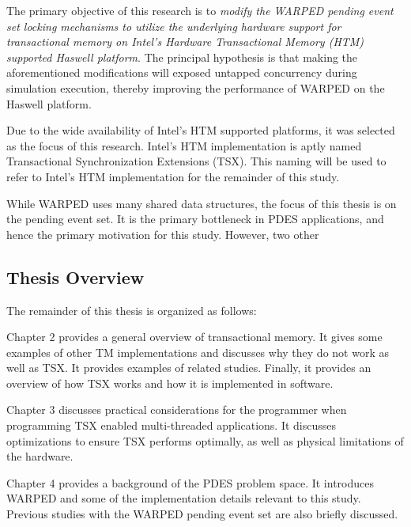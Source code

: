 \documentclass[a4paper]{article}
\begin{document}
\indent
The primary objective of this research is to \textit{modify the WARPED pending event set
    locking mechanisms to utilize the underlying hardware support for
    transactional memory on Intel's Hardware Transactional Memory (HTM)
supported Haswell platform}.  The principal hypothesis is that making the
aforementioned modifications will exposed untapped concurrency 
during simulation execution, thereby improving the performance of WARPED on the
Haswell platform.
\par

\indent
Due to the wide availability of Intel's HTM supported platforms, it was
selected as the focus of this research.  Intel's HTM implementation is aptly
named Transactional Synchronization Extensions (TSX).  This naming will be used
to refer to Intel's HTM implementation for the remainder of this study.
\par

\indent 
While WARPED uses many shared data structures, the focus of this thesis
is on the pending event set.  It is the primary bottleneck in PDES applications,
and hence the primary motivation for this study.  However, two other 
\par

\subsection{\textbf{Thesis Overview}}

The remainder of this thesis is organized as follows:
\par

\indent 
Chapter 2 provides a general overview of transactional memory.  It gives
some examples of other TM implementations and discusses why they do not work as
well as TSX.  It provides examples of related studies.  Finally, it provides an
overview of how TSX works and how it is implemented in software.
\par

\indent
Chapter 3 discusses practical considerations for the programmer when programming
TSX enabled multi-threaded applications.  It discusses optimizations to ensure
TSX performs optimally, as well as physical limitations of the hardware.
\par

\indent
Chapter 4 provides a background of the PDES problem space.  It introduces
WARPED and some of the implementation details relevant to this study. Previous
studies with the WARPED pending event set are also briefly discussed.
\par
\end{document}
